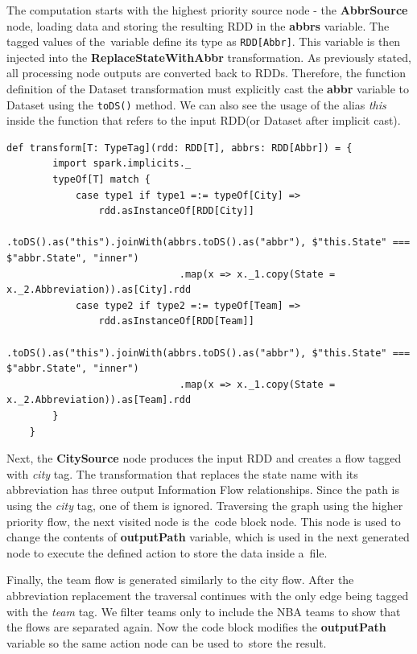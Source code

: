 The computation starts with the highest priority source node - the \textbf{AbbrSource} node, loading data and storing the resulting RDD in the \textbf{abbrs} variable. The tagged values of the~variable define its type as \texttt{RDD[Abbr]}. This variable is then injected into the \textbf{ReplaceStateWithAbbr} transformation. As previously stated, all processing node outputs are converted back to RDDs. Therefore, the function definition of the Dataset transformation must explicitly cast the \textbf{abbr} variable to Dataset using the \texttt{toDS()} method. We can also see the usage of the alias \textit{this} inside the function that refers to the input RDD(or Dataset after implicit cast). 


\begin{lstlisting}[style=myScalastyle, caption={Using reflection to determine the RDD type parameter}, label={lst:pagerankloop}]
    def transform[T: TypeTag](rdd: RDD[T], abbrs: RDD[Abbr]) = {
		import spark.implicits._
		typeOf[T] match {
			case type1 if type1 =:= typeOf[City] =>
				rdd.asInstanceOf[RDD[City]]
					.toDS().as("this").joinWith(abbrs.toDS().as("abbr"), $"this.State" === $"abbr.State", "inner")
					          .map(x => x._1.copy(State = x._2.Abbreviation)).as[City].rdd
			case type2 if type2 =:= typeOf[Team] =>
				rdd.asInstanceOf[RDD[Team]]
					.toDS().as("this").joinWith(abbrs.toDS().as("abbr"), $"this.State" === $"abbr.State", "inner")
					          .map(x => x._1.copy(State = x._2.Abbreviation)).as[Team].rdd
		}
	}
\end{lstlisting}


Next, the \textbf{CitySource} node produces the input RDD and creates a flow tagged with \textit{city} tag. The transformation that replaces the state name with its abbreviation has three output Information Flow relationships. Since the path is using the \textit{city} tag, one of them is ignored. Traversing the graph using the higher priority flow, the next visited node is the~code block node. This node is used to change the contents of \textbf{outputPath} variable, which is used in the next generated node to execute the defined action to store the data inside a~file.

Finally, the team flow is generated similarly to the city flow. After the abbreviation replacement the traversal continues with the only edge being tagged with the \textit{team} tag. We filter teams only to include the NBA teams to show that the flows are separated again. Now the code block modifies the \textbf{outputPath} variable so the same action node can be used to~store the result. 

